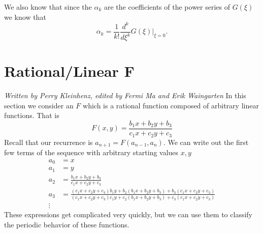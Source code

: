 \documentclass[12pt]{article}
\begin{document}
We also know that since the $\alpha_k$ are the coefficients of the power series of $G(\xi)$ we know that 
\begin{equation*}
\alpha_k = \frac{1}{k!} \frac{d^k}{d \xi^k} G(\xi) |_{\xi=0}.
\end{equation*}


\section{Rational/Linear F}
\emph{Written by Perry Kleinhenz, edited by Fermi Ma and Erik Waingarten}
In this section we consider an $F$ which is a rational function composed of arbitrary linear functions. That is 
\begin{equation}
\label{rationallinear}
F(x,y) = \frac{ b_1 x + b_2 y + b_3}{ c_1 x+ c_2 y + c_3}
\end{equation}
Recall that our recurrence is $a_{n+1} = F( a_{n-1}, a_n)$. We can write out the first few terms of the sequence with arbitrary starting values $x,y$
\begin{align}
a_0 &= x \\ 
a_1 &=y \\
a_2 &= \frac{ b_1 x + b_2 y + b_3}{ c_1 x+ c_2 y + c_3}\\
\label{athree}a_3 &= \frac{(c_1 x+ c_2 y + c_3) b_1 y + b_2 (b_1 x + b_2 y + b_3)+ b_3(c_1 x+ c_2 y + c_3)}{ (c_1 x+ c_2 y + c_3)c_1 y+ c_2 (b_1 x + b_2 y + b_3) + c_3(c_1 x+ c_2 y + c_3)} \\
\vdots
\end{align}
These expressions get complicated very quickly, but we can use them to classify the periodic behavior of these functions.
\end{document}
